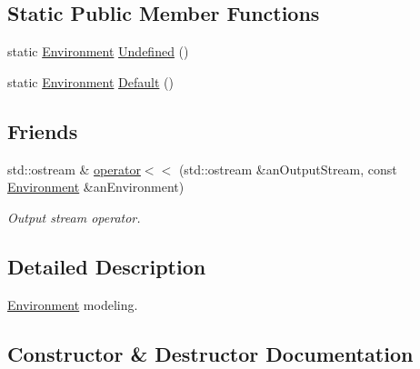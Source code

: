 \subsection*{Static Public Member Functions}
\begin{DoxyCompactItemize}
\item 
static \hyperlink{classlibrary_1_1physics_1_1_environment}{Environment} \hyperlink{classlibrary_1_1physics_1_1_environment_a8d1dfff3867d59ecdebd3ee6e98a2dab}{Undefined} ()
\item 
static \hyperlink{classlibrary_1_1physics_1_1_environment}{Environment} \hyperlink{classlibrary_1_1physics_1_1_environment_a7fcc57999bfb9c0c7e70b7cc783e30c8}{Default} ()
\end{DoxyCompactItemize}
\subsection*{Friends}
\begin{DoxyCompactItemize}
\item 
std\+::ostream \& \hyperlink{classlibrary_1_1physics_1_1_environment_a7bc4b39898452fbe5ce3a8de75ad2596}{operator$<$$<$} (std\+::ostream \&an\+Output\+Stream, const \hyperlink{classlibrary_1_1physics_1_1_environment}{Environment} \&an\+Environment)
\begin{DoxyCompactList}\small\item\em Output stream operator. \end{DoxyCompactList}\end{DoxyCompactItemize}


\subsection{Detailed Description}
\hyperlink{classlibrary_1_1physics_1_1_environment}{Environment} modeling. 

\subsection{Constructor \& Destructor Documentation}
\mbox{\label{classlibrary_1_1physics_1_1_environment_a51854f130c31eb075ea623e332978495}} 
